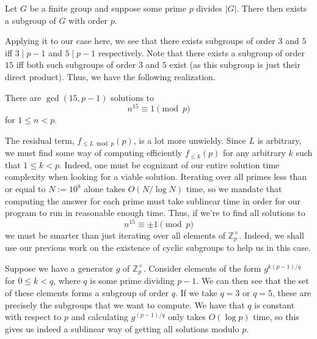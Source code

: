 \documentclass[a4paper, 12pt]{article}
\begin{document}
\begin{solution}
    \begin{sidebox}
    \begin{theorem}
        Let \( G \) be a finite group and suppose some prime \( p \) divides \( |G| \). There then exists a subgroup of \( G \) with order \( p \).
    \end{theorem}
    \end{sidebox}

    Applying it to our case here, we see that there exists subgroups of order \( 3 \) and \( 5 \) iff \( 3 \mid p - 1 \) and \( 5 \mid p - 1 \) respectively. Note that there exists a subgroup of order \( 15 \) iff both such subgroups of order \( 3 \) and \( 5 \) exist (as this subgroup is just their direct product). Thus, we have the following realization.

    \begin{lemma}
        There are \( \gcd(15, p - 1) \) solutions to
        \[
            n^{15} \equiv 1 \pmod{p}
        \]
        for \( 1 \le n < p \).
    \end{lemma}

    The residual term, \( f_{\le L \bmod p}(p) \), is a lot more unwieldy. Since \( L \) is arbitrary, we must find some way of computing efficiently \( f_{\le k}(p) \) for any arbitrary \( k \) such that \( 1 \le k < p \). Indeed, one must be cognizant of our entire solution time complexity when looking for a viable solution. Iterating over all primes less than or equal to \( N := 10^8 \) alone takes \( O(N / \log{N}) \) time, so we mandate that computing the answer for each prime must take sublinear time in order for our program to run in reasonable enough time. Thus, if we're to find all solutions to
    \[
        n^{15} \equiv \pm 1 \pmod{p}
    \]
    we must be smarter than just iterating over all elements of \( \mathbb{Z}_p^\times \). Indeed, we shall use our previous work on the existence of cyclic subgroups to help us in this case.

    \begin{observation}
        Suppose we have a generator \( g \) of \( \mathbb{Z}_p^{\times} \). Consider elements of the form \( g^{k(p-1)/q} \) for \( 0 \le k < q \), where \( q \) is some prime dividing \( p - 1 \). We can then see that the set of these elements forms a subgroup of order \( q \). If we take \( q = 3 \) or \( q = 5 \), these are precisely the subgroups that we want to compute. We have that \( q \) is constant with respect to \( p \) and calculating \( g^{(p-1)/q} \) only takes \( O (\log p) \) time, so this gives us indeed a sublinear way of getting all solutions modulo \( p \).
    \end{observation}


\end{solution}
\end{document}
